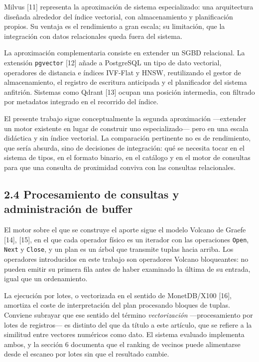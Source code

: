 \documentclass[11pt,a4paper]{article}
\let\pandocsubsection\subsection
\let\subsection\section
\let\subsubsection\pandocsubsection
\begin{document}
Milvus {[}11{]} representa la aproximación de sistema especializado: una
arquitectura diseñada alrededor del índice vectorial, con almacenamiento
y planificación propios. Su ventaja es el rendimiento a gran escala; su
limitación, que la integración con datos relacionales queda fuera del
sistema.

La aproximación complementaria consiste en extender un SGBD relacional.
La extensión \texttt{pgvector} {[}12{]} añade a PostgreSQL un tipo de
dato vectorial, operadores de distancia e índices IVF-Flat y HNSW,
reutilizando el gestor de almacenamiento, el registro de escritura
anticipada y el planificador del sistema anfitrión. Sistemas como Qdrant
{[}13{]} ocupan una posición intermedia, con filtrado por metadatos
integrado en el recorrido del índice.

El presente trabajo sigue conceptualmente la segunda aproximación
---extender un motor existente en lugar de construir uno
especializado--- pero en una escala didáctica y sin índice vectorial. La
comparación pertinente no es de rendimiento, que sería absurda, sino de
decisiones de integración: qué se necesita tocar en el sistema de tipos,
en el formato binario, en el catálogo y en el motor de consultas para
que una consulta de proximidad conviva con las consultas relacionales.

\subsubsection{2.4 Procesamiento de consultas y administración de
buffer}\label{24-procesamiento-de-consultas-y-administraciuxf3n-de-buffer}

El motor sobre el que se construye el aporte sigue el modelo Volcano de
Graefe {[}14{]}, {[}15{]}, en el que cada operador físico es un iterador
con las operaciones \texttt{Open}, \texttt{Next} y \texttt{Close}, y un
plan es un árbol que transmite tuplas hacia arriba. Los operadores
introducidos en este trabajo son operadores Volcano bloqueantes: no
pueden emitir su primera fila antes de haber examinado la última de su
entrada, igual que un ordenamiento.

La ejecución por lotes, o vectorizada en el sentido de MonetDB/X100
{[}16{]}, amortiza el coste de interpretación del plan procesando
bloques de tuplas. Conviene subrayar que ese sentido del término
\emph{vectorización} ---procesamiento por lotes de registros--- es
distinto del que da título a este artículo, que se refiere a la
similitud entre vectores numéricos como dato. El sistema evaluado
implementa ambos, y la sección 6 documenta que el ranking de vecinos
puede alimentarse desde el escaneo por lotes sin que el resultado
cambie.
\end{document}
